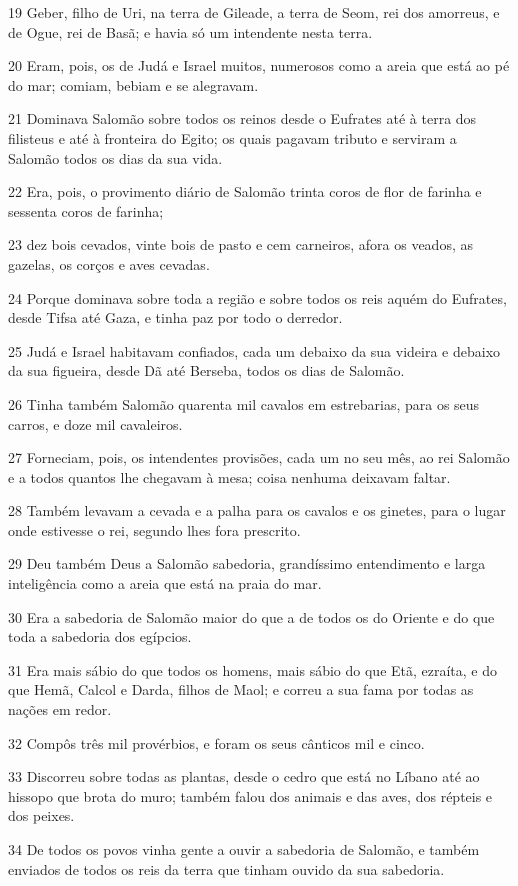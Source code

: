 \par 19 Geber, filho de Uri, na terra de Gileade, a terra de Seom, rei dos amorreus, e de Ogue, rei de Basã; e havia só um intendente nesta terra.
\par 20 Eram, pois, os de Judá e Israel muitos, numerosos como a areia que está ao pé do mar; comiam, bebiam e se alegravam.
\par 21 Dominava Salomão sobre todos os reinos desde o Eufrates até à terra dos filisteus e até à fronteira do Egito; os quais pagavam tributo e serviram a Salomão todos os dias da sua vida.
\par 22 Era, pois, o provimento diário de Salomão trinta coros de flor de farinha e sessenta coros de farinha;
\par 23 dez bois cevados, vinte bois de pasto e cem carneiros, afora os veados, as gazelas, os corços e aves cevadas.
\par 24 Porque dominava sobre toda a região e sobre todos os reis aquém do Eufrates, desde Tifsa até Gaza, e tinha paz por todo o derredor.
\par 25 Judá e Israel habitavam confiados, cada um debaixo da sua videira e debaixo da sua figueira, desde Dã até Berseba, todos os dias de Salomão.
\par 26 Tinha também Salomão quarenta mil cavalos em estrebarias, para os seus carros, e doze mil cavaleiros.
\par 27 Forneciam, pois, os intendentes provisões, cada um no seu mês, ao rei Salomão e a todos quantos lhe chegavam à mesa; coisa nenhuma deixavam faltar.
\par 28 Também levavam a cevada e a palha para os cavalos e os ginetes, para o lugar onde estivesse o rei, segundo lhes fora prescrito.
\par 29 Deu também Deus a Salomão sabedoria, grandíssimo entendimento e larga inteligência como a areia que está na praia do mar.
\par 30 Era a sabedoria de Salomão maior do que a de todos os do Oriente e do que toda a sabedoria dos egípcios.
\par 31 Era mais sábio do que todos os homens, mais sábio do que Etã, ezraíta, e do que Hemã, Calcol e Darda, filhos de Maol; e correu a sua fama por todas as nações em redor.
\par 32 Compôs três mil provérbios, e foram os seus cânticos mil e cinco.
\par 33 Discorreu sobre todas as plantas, desde o cedro que está no Líbano até ao hissopo que brota do muro; também falou dos animais e das aves, dos répteis e dos peixes.
\par 34 De todos os povos vinha gente a ouvir a sabedoria de Salomão, e também enviados de todos os reis da terra que tinham ouvido da sua sabedoria.

